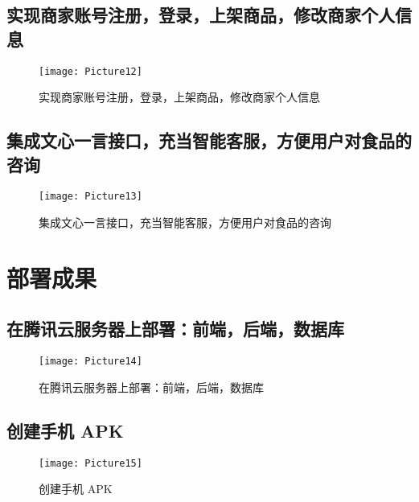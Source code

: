 \subsection{实现商家账号注册，登录，上架商品，修改商家个人信息}

\begin{figure}[H]
  \centering
  \texttt{[image: Picture12]}
  \caption{实现商家账号注册，登录，上架商品，修改商家个人信息}\label{fig:xml}
  \end{figure}

  \subsection{集成文心一言接口，充当智能客服，方便用户对食品的咨询}

  \begin{figure}[H]
  \centering
  \texttt{[image: Picture13]}
  \caption{集成文心一言接口，充当智能客服，方便用户对食品的咨询}\label{fig:xml}
  \end{figure}


\section{部署成果}

\subsection{在腾讯云服务器上部署：前端，后端，数据库}

\begin{figure}[H]
  \centering
  \texttt{[image: Picture14]}
  \caption{在腾讯云服务器上部署：前端，后端，数据库}\label{fig:xml}
  \end{figure}
\subsection{创建手机 APK}

\begin{figure}[H]
  \centering
  \texttt{[image: Picture15]}
  \caption{创建手机 APK}\label{fig:xml}
  \end{figure}

